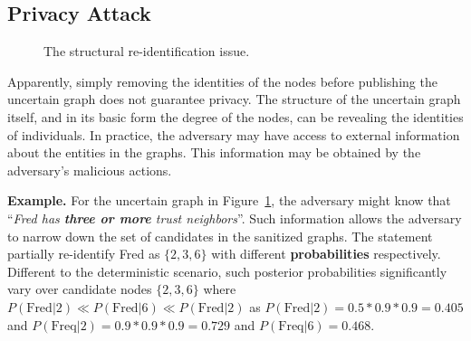 \subsection{Privacy Attack}
\label{sec:AMPC}
\begin{figure}[!htb]
    \vspace{-4pt}
    \caption{The structural re-identification issue.}
    \label{fig:privacyAttack}
\end{figure} 
Apparently, simply removing the identities of the nodes before publishing the uncertain graph does not guarantee privacy.  The structure of the uncertain graph itself, and in its basic form the degree of the nodes, can be revealing the identities of individuals. 
In practice, the adversary may have access to external information about the entities in the graphs. This information may be obtained by the adversary's malicious actions. 

\textbf{Example.} For the uncertain graph in Figure~\ref{fig:privacyAttack}, the adversary might know that ``\emph{Fred has \textbf{three or more} trust neighbors}''. Such information allows the adversary to narrow down the set of candidates in the sanitized graphs.  The statement partially re-identify Fred as $\lbrace 2,3,6 \rbrace$ with different \textbf{probabilities} respectively. 
Different to the deterministic scenario, such posterior probabilities significantly vary over candidate nodes $\lbrace 2,3,6 \rbrace$ where $P(\text{Fred}|2) \ll P(\text{Fred}|6) \ll P(\text{Fred}|2)$ as $P(\text{Fred}|2)=0.5*0.9*0.9=0.405$ and $P(\text{Freq}|2)=0.9*0.9*0.9=0.729$ and $P(\text{Freq}|6)=0.468$. 


